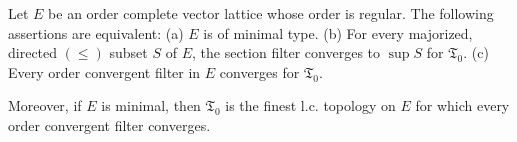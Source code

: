 Let $E$ be an order complete vector lattice whose order is regular. The following assertions are equivalent:
(a) $E$ is of minimal type.
(b) For every majorized, directed $(\leq)$ subset $S$ of $E$, the section filter converges to $\sup S$ for $\mathfrak{T}_0$.
(c) Every order convergent filter in $E$ converges for $\mathfrak{T}_0$.

Moreover, if $E$ is minimal, then $\mathfrak{T}_0$ is the finest l.c. topology on $E$ for which every order convergent filter converges.
